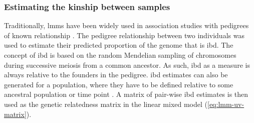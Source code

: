 \subsubsection{Estimating the kinship between samples}
 \label{subsubsection:grm}
Traditionally, \glspl{lmm} have been widely used in association studies with pedigrees of known relationship \citep{Eu-ahsunthornwattana2014}. The pedigree relationship between two individuals was used to estimate their predicted proportion of the genome that is \gls{ibd}. The concept of \gls{ibd} is based on the random Mendelian sampling of chromosomes during successive meiosis from a common ancestor. As such, \gls{ibd} as a measure is always relative to the founders in the pedigree. \gls{ibd} estimates can also be generated for a population, where they have to be defined relative to some ancestral population or time point \citep{Browning2010,Glazner2012}. A matrix of pair-wise \gls{ibd} estimates is then used as the genetic relatedness matrix  in the linear mixed model (\cref{eq:lmm-uv-matrix}).

